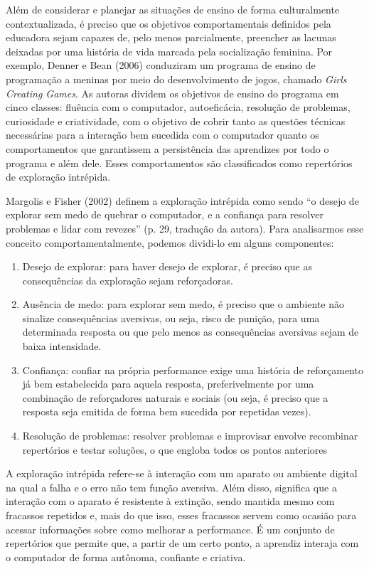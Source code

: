 Além de considerar e planejar as situações de ensino de forma culturalmente contextualizada, é preciso que os objetivos comportamentais definidos pela educadora sejam capazes de, pelo menos parcialmente, preencher as lacunas deixadas por uma história de vida marcada pela socialização feminina. Por exemplo, Denner e Bean (2006) conduziram um programa de ensino de programação a meninas por meio do desenvolvimento de jogos, chamado \textit{Girls Creating Games}. As autoras dividem os objetivos de ensino do programa em cinco classes: fluência com o computador, autoeficácia, resolução de problemas, curiosidade e criatividade, com o objetivo de cobrir tanto as questões técnicas necessárias para a interação bem sucedida com o computador quanto os comportamentos que garantissem a persistência das aprendizes por todo o programa e além dele. Esses comportamentos são classificados como repertórios de exploração intrépida. 

Margolis e Fisher (2002) definem a exploração intrépida como sendo “o desejo de explorar sem medo de quebrar o computador, e a confiança para resolver problemas e lidar com revezes” (p. 29, tradução da autora). Para analisarmos esse conceito comportamentalmente, podemos dividi-lo em alguns componentes:

\begin{enumerate}
    \item Desejo de explorar: para haver desejo de explorar, é preciso que as consequências da exploração sejam reforçadoras.
    \item Ausência de medo: para explorar sem medo, é preciso que o ambiente não sinalize consequências aversivas, ou seja, risco de punição, para uma determinada resposta ou que pelo menos as consequências aversivas sejam de baixa intensidade.
    \item Confiança: confiar na própria performance exige uma história de reforçamento já bem estabelecida para aquela resposta, preferivelmente por uma combinação de reforçadores naturais e sociais (ou seja, é preciso que a resposta seja emitida de forma bem sucedida por repetidas vezes).
    \item Resolução de problemas: resolver problemas e improvisar envolve recombinar repertórios e testar soluções, o que engloba todos os pontos anteriores
\end{enumerate}

A exploração intrépida refere-se à interação com um aparato ou ambiente digital na qual a falha e o erro não tem função aversiva. Além disso, significa que a interação com o aparato é resistente à extinção, sendo mantida mesmo com fracassos repetidos e, mais do que isso, esses fracassos servem como ocasião para acessar informações sobre como melhorar a performance. É um conjunto de repertórios que permite que, a partir de um certo ponto, a aprendiz interaja com o computador de forma autônoma, confiante e criativa.

